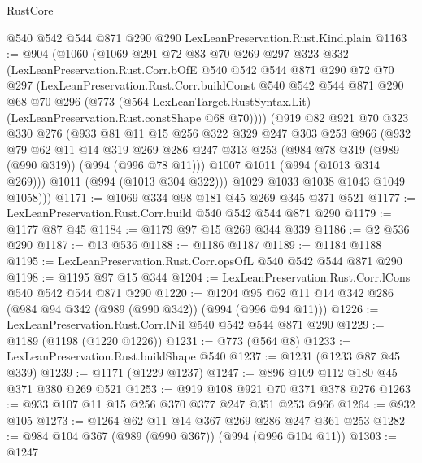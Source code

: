 \begin{lexlean}{RustCore}
\begin{coremodule}
    @540
    @542
    @544
    @871
    @290
    @290
    LexLeanPreservation.Rust.Kind.plain
@1163 := @904
    (@1060
      (@1069
        @291
        @72
        @83
        @70
        @269
        @297
        @323
        @332
        (LexLeanPreservation.Rust.Corr.bOfE
          @540
          @542
          @544
          @871
          @290
          @72
          @70
          @297
          (LexLeanPreservation.Rust.Corr.buildConst
            @540
            @542
            @544
            @871
            @290
            @68
            @70
            @296
            (@773
              (@564 LexLeanTarget.RustSyntax.Lit)
              (LexLeanPreservation.Rust.constShape @68 @70))))
        (@919
          @82
          @921
          @70
          @323
          @330
          @276
          (@933
            @81
            @11
            @15
            @256
            @322
            @329
            @247
            @303
            @253
            @966
            (@932
              @79
              @62
              @11
              @14
              @319
              @269
              @286
              @247
              @313
              @253
              (@984 @78 @319 (@989 (@990 @319)) (@994 (@996 @78 @11)))
              @1007
              @1011
              (@994 (@1013 @314 @269)))
            @1011
            (@994 (@1013 @304 @322)))
          @1029
          @1033
          @1038
          @1043
          @1049
          @1058)))
@1171 := @1069 @334 @98 @181 @45 @269 @345 @371 @521
@1177 := LexLeanPreservation.Rust.Corr.build @540 @542 @544 @871 @290
@1179 := @1177 @87 @45
@1184 := @1179 @97 @15 @269 @344 @339
@1186 := @2 @536 @290
@1187 := @13 @536
@1188 := @1186 @1187
@1189 := @1184 @1188
@1195 := LexLeanPreservation.Rust.Corr.opsOfL @540 @542 @544 @871 @290
@1198 := @1195 @97 @15 @344
@1204 := LexLeanPreservation.Rust.Corr.lCons @540 @542 @544 @871 @290
@1220 := @1204 @95 @62 @11 @14 @342 @286 (@984 @94 @342 (@989 (@990 @342)) (@994 (@996 @94 @11)))
@1226 := LexLeanPreservation.Rust.Corr.lNil @540 @542 @544 @871 @290
@1229 := @1189 (@1198 (@1220 @1226))
@1231 := @773 (@564 @8)
@1233 := LexLeanPreservation.Rust.buildShape @540
@1237 := @1231 (@1233 @87 @45 @339)
@1239 := @1171 (@1229 @1237)
@1247 := @896 @109 @112 @180 @45 @371 @380 @269 @521
@1253 := @919 @108 @921 @70 @371 @378 @276
@1263 := @933 @107 @11 @15 @256 @370 @377 @247 @351 @253 @966
@1264 := @932 @105
@1273 := @1264 @62 @11 @14 @367 @269 @286 @247 @361 @253
@1282 := @984 @104 @367 (@989 (@990 @367)) (@994 (@996 @104 @11))
@1303 := @1247

\end{coremodule}
\end{lexlean}
